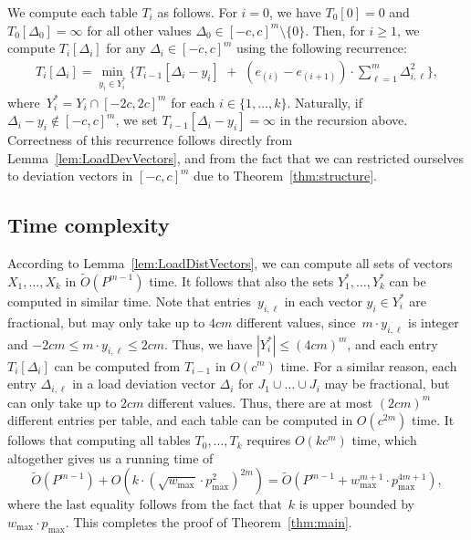 \documentclass[11pt]{llncs}
\begin{document}
We compute each table $T_i$ as follows. For $i = 0$, we have $T_0[0] = 0$ and $T_0[\Delta_0] = \infty$ for all other values $\Delta_0 \in [-c, c]^{m} \setminus \{0\}$. Then, for $i \ge 1$, we compute $T_i[\Delta_i]$ for any $\Delta_i \in [-c,c]^m$ using the following recurrence:
\begin{align*}
T_i[\Delta_i] = \min_{y_i \in Y^*_i} \Big\{T_{i-1}[\Delta_i-y_i] \,\,+\,\, (e_{(i)}-e_{(i+1)}) \cdot \sum^m_{\ell=1}   \Delta_{i,\ell}^2\Big\},
\end{align*}
where~$Y^*_i = Y_i\cap [-2c, 2c]^{m}$ for each $i \in \{1,\ldots,k\}$. Naturally, if $\Delta_i-y_i \notin [-c, c]^{m}$, we set $T_{i-1}[\Delta_i-y_i]=\infty$ in the recursion above. Correctness of this recurrence follows directly from Lemma~\ref{lem:LoadDevVectors}, and from the fact that we can restricted ourselves to deviation vectors in $[-c,c]^m$ due to Theorem~\ref{thm:structure}. %



\subsection{Time complexity}
According to Lemma~\ref{lem:LoadDistVectors}, we can compute all sets of vectors $X_1,\ldots,X_k$ in $\widetilde{O}(P^{m-1})$ time. It follows that also the sets $Y^*_1,\ldots,Y^*_k$ can be computed in similar time. Note that entries~$y_{i,\ell}$ in each vector $y_i \in Y^*_i$ are fractional, but may only take up to $4cm$ different values, since~$m \cdot y_{i,\ell}$ is integer and $-2cm \leq m \cdot y_{i,\ell} \leq 2cm$. Thus, we have $|Y^*_i| \le (4cm)^m$, and each entry~$T_i[\Delta_i]$ can be computed from $T_{i-1}$ in $O(c^m)$ time. For a similar reason, each entry $\Delta_{i,\ell}$ in a load deviation vector $\Delta_{i}$ for $J_1 \cup \ldots \cup J_i$ may be fractional, but can only take up to $2cm$ different values. Thus, there are at most $(2cm)^m$ different entries per table, and each table can be computed in $O(c^{2m})$ time. It follows that  computing all tables $T_0, \dots, T_{k}$  requires $O(k c^{m})$ time, which altogether gives us a running time of 
$$
\widetilde{O}(P^{m-1}) +  O( k \cdot ( \sqrt{w_{\max}} \cdot p_{\max}^2)^{2m}) = \widetilde{O}(P^{m-1} + w_{\max}^{m+1} \cdot p_{\max}^{4m+1}),
$$
where the last equality follows from the fact that~$k$ is upper bounded by  $w_{\max} \cdot p_{\max}$. This completes the proof of 
Theorem~\ref{thm:main}.
\end{document}

